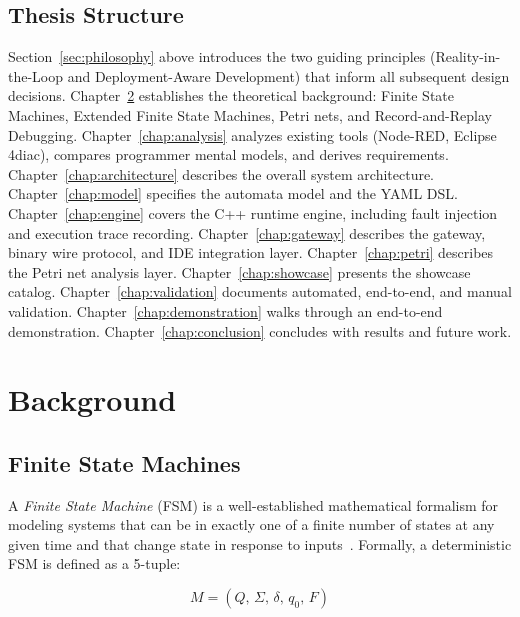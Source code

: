 \section{Thesis Structure}

Section~\ref{sec:philosophy} above introduces the two guiding principles (Reality-in-the-Loop and Deployment-Aware Development) that inform all subsequent design decisions. Chapter~\ref{chap:background} establishes the theoretical background: Finite State Machines, Extended Finite State Machines, Petri nets, and Record-and-Replay Debugging. Chapter~\ref{chap:analysis} analyzes existing tools (Node-RED, Eclipse 4diac), compares programmer mental models, and derives requirements. Chapter~\ref{chap:architecture} describes the overall system architecture. Chapter~\ref{chap:model} specifies the automata model and the YAML DSL. Chapter~\ref{chap:engine} covers the C++ runtime engine, including fault injection and execution trace recording. Chapter~\ref{chap:gateway} describes the gateway, binary wire protocol, and IDE integration layer. Chapter~\ref{chap:petri} describes the Petri net analysis layer. Chapter~\ref{chap:showcase} presents the showcase catalog. Chapter~\ref{chap:validation} documents automated, end-to-end, and manual validation. Chapter~\ref{chap:demonstration} walks through an end-to-end demonstration. Chapter~\ref{chap:conclusion} concludes with results and future work.

\chapter{Background}
\label{chap:background}

\section{Finite State Machines}
\label{sec:fsm}

A \textit{Finite State Machine} (FSM) is a well-established mathematical formalism for modeling systems that can be in exactly one of a finite number of states at any given time and that change state in response to inputs~\cite{Hopcroft2006}. Formally, a deterministic FSM is defined as a 5-tuple:

\begin{equation}
  M = (Q,\, \Sigma,\, \delta,\, q_0,\, F)
\end{equation}

